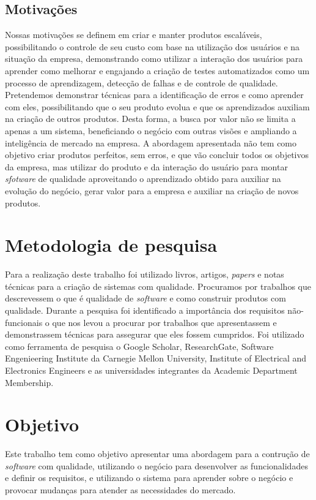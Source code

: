     \section{Motivações}
      Nossas motivações se definem em criar e manter produtos escaláveis,
      possibilitando o controle de seu custo com base na utilização
      dos usuários e na situação da empresa, demonstrando como utilizar a interação
      dos usuários para aprender como melhorar e engajando a criação de testes
      automatizados como um processo de aprendizagem, detecção de falhas e de
      controle de qualidade. \newline
      Pretendemos demonstrar técnicas para a identificação de erros e como
      aprender com eles, possibilitando que o seu produto evolua e que os
      aprendizados auxiliam na criação de outros produtos. Desta forma, a busca
      por valor não se limita a apenas a um sistema, beneficiando o negócio com
      outras visões e ampliando a inteligência de mercado na empresa. A abordagem
      apresentada não tem como objetivo criar produtos perfeitos, sem erros, e
      que vão concluir todos os objetivos da empresa, mas utilizar do produto e da
      interação do usuário para montar \textit{sfotware} de qualidade aproveitando
      o aprendizado obtido para auxiliar na evolução do negócio, gerar valor para
      a empresa e auxiliar na criação de novos produtos.

  \chapter{Metodologia de pesquisa}
    Para a realização deste trabalho foi utilizado livros, artigos, \textit{papers}
    e notas técnicas para a criação de sistemas com qualidade. Procuramos por trabalhos
    que descrevessem o que é qualidade de \textit{software} e como construir
    produtos com qualidade. Durante a pesquisa foi identificado a importância dos
    requisitos não-funcionais o que nos levou a procurar por trabalhos que
    apresentassem e demonstrassem técnicas para assegurar que eles fossem
    cumpridos. \newline
    Foi utilizado como ferramenta de pesquisa o Google Scholar, ResearchGate,
    Software Engenieering Institute da Carnegie Mellon University, Institute of
    Electrical and Electronics Engineers e as universidades integrantes da
    Academic Department Membership.

  \chapter{Objetivo}
    Este trabalho tem como objetivo apresentar uma abordagem para a contrução de
    \textit{software} com qualidade, utilizando o negócio para desenvolver as
    funcionalidades e definir os requisitos, e utilizando o sistema para aprender
    sobre o negócio e provocar mudanças para atender as necessidades do mercado.
